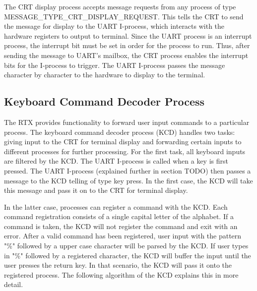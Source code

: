 \documentclass[12pt,twocolumn]{report}
\begin{document}
 The CRT display process accepts message requests from any process of type MESSAGE\_TYPE\_CRT\_DISPLAY\_REQUEST. This tells the CRT to send the message for display to the UART I-process, which interacts with the hardware registers to output to terminal. Since the UART process is an interrupt process, the interrupt bit must be set in order for the process to run. Thus, after sending the message to UART's mailbox, the CRT process enables the interrupt bits for the I-process to trigger. The UART I-process passes the message character by character to the hardware to display to the terminal.

\subsection{Keyboard Command Decoder Process}
\label{sec:kcd_process}
The RTX provides functionality to forward user input commands to a particular process. The keyboard command decoder process (KCD) handles two tasks: giving input to the CRT for terminal display and forwarding certain inputs to different processes for further processing. For the first task, all keyboard inputs are filtered by the KCD. The UART I-process is called when a key is first pressed. The UART I-process (explained further in section TODO) then passes a message to the KCD telling of type key press. In the first case, the KCD will take this message and pass it on to the CRT for terminal display.

In the latter case, processes can register a command with the KCD. Each command registration consists of a single capital letter of the alphabet. If a command is taken, the KCD will not register the command and exit with an error. After a valid command has been registered, user input with the pattern "\%" followed by a upper case character will be parsed by the KCD. If user types in "\%" followed by a registered character, the KCD will buffer the input until the user presses the return key. In that scenario, the KCD will pass it onto the registered process. The following algorithm of the KCD explains this in more detail.
\end{document}
